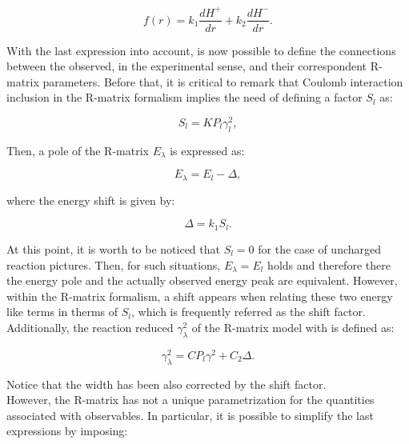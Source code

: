 \documentclass[openany]{book}
\begin{document}
\begin{equation}   \label{eq:rmatrix_f_Coulomb}
	f(r) = k_1\frac{dH^{+}}{dr}  + k_2 \frac{dH^{-}}{dr}.
\end{equation}

With the last expression into account, is now possible to define the connections between the observed, in the experimental sense, and their correspondent R-matrix parameters. Before that, it is critical to remark that Coulomb interaction inclusion in the R-matrix formalism implies the need of defining a factor $S_l$ as:

\begin{equation}   \label{eq:rmatrix_shiftFactor}
	S_l= K P_l\gamma^2_l,
\end{equation}

Then, a pole of the R-matrix $E_\lambda$ is expressed as: 

\begin{equation}  \label{eq:rmatrix_energyPole}
	E_\lambda =  E_l - \Delta, 
\end{equation}

where the energy shift is given by: 

\begin{equation}  \label{eq:rmatrix_energyShift}
	\Delta = k_1 S_l.
\end{equation}

At this point, it is worth to be noticed that $S_l = 0$ for the case of uncharged reaction pictures. Then, for such situations, $E_\lambda = E_l$ holds and therefore there the energy pole and the actually observed energy peak are equivalent. However, within the R-matrix formalism, a shift appears when relating these two energy like terms in therms of $S_l$, which is frequently referred as the shift factor. \\

Additionally, the reaction reduced $\gamma^2_\lambda$ of the R-matrix model  with is defined as:

\begin{equation}   \label{eq:rmatrix_reducedWidth_formal}
	\gamma^2_\lambda =C P_l\gamma^2 + C_2 \Delta.
\end{equation}

Notice that the width has been also corrected by the shift factor. \\

However, the R-matrix has not a unique parametrization for the quantities associated with observables. In particular, it is possible to simplify the last expressions by imposing: 
\end{document}
